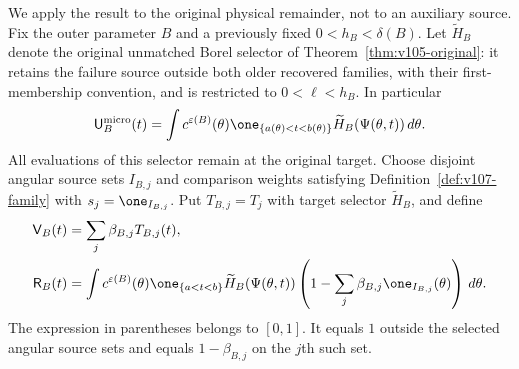 We apply the result to the original physical remainder, not to an
auxiliary source. Fix the outer parameter $B$ and a previously fixed
$0<h_B<\delta(B)$. Let $\widetilde H_B$ denote the original unmatched Borel selector
of Theorem~\ref{thm:v105-original}: it retains the failure source
outside both older recovered families, with their first-membership
convention, and is restricted to $0<\ell<h_B$. In particular
\[
 \mathsf U_B^{\rm micro}(t)=\int
 c^{\varepsilon(B)}(\theta)\one_{\{a(\theta)<t<b(\theta)\}}
                  \widetilde H_B(\Psi(\theta,t))\,d\theta.
\]
All evaluations of this selector remain at the original target.
Choose disjoint angular source sets $I_{B,j}$ and comparison weights
satisfying Definition~\ref{def:v107-family} with $s_j=\one_{I_{B,j}}$.
Put $T_{B,j}=T_j$ with target selector $\widetilde H_B$, and define
\begin{align}
 \mathsf V_B(t)&=\sum_j\beta_{B,j}T_{B,j}(t),\label{eq:v107-V}\\
 \mathsf R_B(t)&=
 \int c^{\varepsilon(B)}(\theta)\one_{\{a<t<b\}}
       \widetilde H_B(\Psi(\theta,t))
       \left(1-\sum_j\beta_{B,j}\one_{I_{B,j}}(\theta)\right)
                       \,d\theta.\label{eq:v107-R}
\end{align}
The expression in parentheses belongs to $[0,1]$. It equals $1$
outside the selected angular source sets and equals $1-\beta_{B,j}$
on the $j$th such set.

